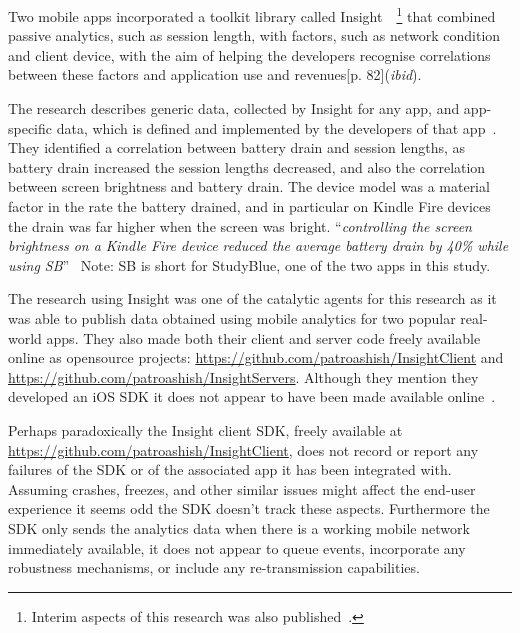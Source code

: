 Two mobile apps incorporated a toolkit library called Insight~\citep[p. 82]{patro2015_building_blocks_to_understand_wireless_experience}~\footnote{Interim aspects of this research was also published~\citet{patro2013_capturing_mobile_experience_in_the_wild}.} that combined passive analytics, such as session length, with factors, such as network condition and client device, with the aim of helping the developers recognise correlations between these factors and application use and revenues[p. 82](\textit{ibid}).

The research describes generic data, collected by Insight for any app, and app-specific data, which is defined and implemented by the developers of that app~\citep[pp. 87-88]{patro2015_building_blocks_to_understand_wireless_experience}. They identified a correlation between battery drain and session lengths, as battery drain increased the session lengths decreased, and also the correlation between screen brightness and battery drain. The device model was a material factor in the rate the battery drained, and in particular on Kindle Fire devices the drain was far higher when the screen was bright. ``\emph{controlling the screen brightness on a Kindle Fire device reduced the average battery drain by 40\% while using SB}''~\citep[p. 13]{patro2015_building_blocks_to_understand_wireless_experience} Note: SB is short for StudyBlue, one of the two apps in this study.

The research using Insight was one of the catalytic agents for this research as it was able to publish data obtained using mobile analytics for two popular real-world apps. They also made both their client and server code freely available online as opensource projects: \url{https://github.com/patroashish/InsightClient} and \url{https://github.com/patroashish/InsightServers}. Although they mention they developed an iOS SDK it does not appear to have been made available online~\citep[p. 85]{patro2015_building_blocks_to_understand_wireless_experience}.

Perhaps paradoxically the Insight client SDK, freely available at \url{https://github.com/patroashish/InsightClient}, does not record or report any failures of the SDK or of the associated app it has been integrated with. Assuming crashes, freezes, and other similar issues might affect the end-user experience it seems odd the SDK doesn't track these aspects. Furthermore the SDK only sends the analytics data when there is a working mobile network immediately available, it does not appear to queue events, incorporate any robustness mechanisms, or include any re-transmission capabilities.

